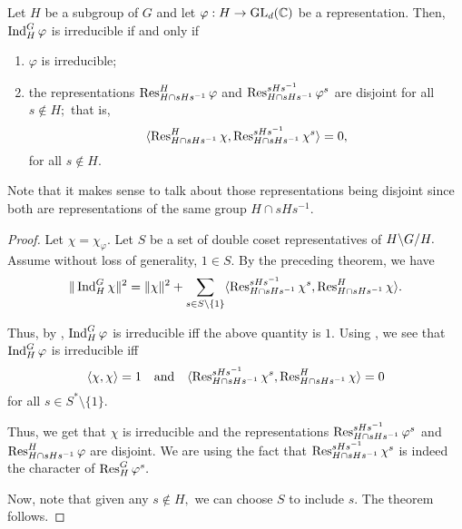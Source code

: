\begin{thm} \label{thm:mackeyirredcrit}
	Let $H$ be a subgroup of $G$ and let $\varphi : H \to \operatorname{GL}_d(\mathbb{C})$ be a representation. Then, $\operatorname{Ind}^{G}_{H}\varphi$ is irreducible if and only if
	\begin{enumerate}
		\item $\varphi$ is irreducible;
		\item the representations $\operatorname{Res}^{H}_{H \cap sHs^{-1}}\varphi$ and $\operatorname{Res}^{sHs^{-1}}_{H \cap sHs^{-1}}\varphi^s$ are disjoint for all $s \notin H;$ that is, 
		\begin{equation*} 
			\langle \operatorname{Res}^{H}_{H \cap sHs^{-1}}\chi, \operatorname{Res}^{sHs^{-1}}_{H \cap sHs^{-1}}\chi^s\rangle = 0,
		\end{equation*}
		for all $s \notin H.$
	\end{enumerate}
\end{thm}

Note that it makes sense to talk about those representations being disjoint since both are representations of the same group $H \cap sHs^{-1}.$

\begin{proof} 
	Let $\chi = \chi_\varphi.$ Let $S$ be a set of double coset representatives of $\dcos{H}{G}{H}.$ Assume without loss of generality, $1 \in S.$ By the preceding theorem, we have
	\begin{equation*} 
		\|\operatorname{Ind}^{G}_{H}\chi\|^2 = \|\chi\|^2 + \sum_{s \in S \setminus \{1\}} \langle \operatorname{Res}^{sHs^{-1}}_{H \cap sHs^{-1}}\chi^s, \operatorname{Res}^{H}_{H \cap sHs^{-1}}\chi\rangle.
	\end{equation*}

	Thus, by , $\operatorname{Ind}^{G}_{H}\varphi$ is irreducible iff the above quantity is $1.$ Using , we see that $\operatorname{Ind}^{G}_{H}\varphi$ is irreducible iff 
	\begin{equation*} 
		\langle \chi, \chi\rangle = 1 \quad\text{and}\quad \langle \operatorname{Res}^{sHs^{-1}}_{H \cap sHs^{-1}}\chi^s, \operatorname{Res}^{H}_{H \cap sHs^{-1}}\chi\rangle = 0
	\end{equation*}
	for all $s \in S^* \setminus \{1\}.$ 

	Thus, we get that $\chi$ is irreducible and the representations $\operatorname{Res}^{sHs^{-1}}_{H \cap sHs^{-1}}\varphi^s$ and $\operatorname{Res}^{H}_{H \cap sHs^{-1}}\varphi$ are disjoint. We are using the fact that $\operatorname{Res}^{sHs^{-1}}_{H \cap sHs^{-1}}\chi^s$ is indeed the character of $\operatorname{Res}^{G}_{H}\varphi^s.$

	Now, note that given any $s \notin H,$ we can choose $S$ to include $s.$ The theorem follows.
\end{proof}

